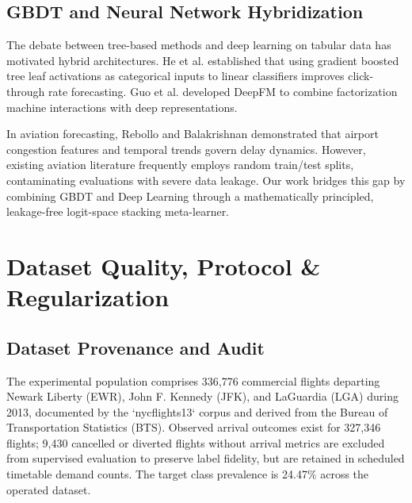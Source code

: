\documentclass[conference]{IEEEtran}
\begin{document}
\subsection{GBDT and Neural Network Hybridization}
The debate between tree-based methods and deep learning on tabular data has motivated hybrid architectures. He et al. \cite{he2014practical} established that using gradient boosted tree leaf activations as categorical inputs to linear classifiers improves click-through rate forecasting. Guo et al. \cite{guo2017deepfm} developed DeepFM to combine factorization machine interactions with deep representations. 

In aviation forecasting, Rebollo and Balakrishnan \cite{rebollo2014characterization} demonstrated that airport congestion features and temporal trends govern delay dynamics. However, existing aviation literature frequently employs random train/test splits, contaminating evaluations with severe data leakage. Our work bridges this gap by combining GBDT and Deep Learning through a mathematically principled, leakage-free logit-space stacking meta-learner.

\section{Dataset Quality, Protocol \& Regularization}
\subsection{Dataset Provenance and Audit}
The experimental population comprises 336,776 commercial flights departing Newark Liberty (EWR), John F. Kennedy (JFK), and LaGuardia (LGA) during 2013, documented by the `nycflights13` corpus \cite{wickham2014tidy} and derived from the Bureau of Transportation Statistics (BTS). Observed arrival outcomes exist for 327,346 flights; 9,430 cancelled or diverted flights without arrival metrics are excluded from supervised evaluation to preserve label fidelity, but are retained in scheduled timetable demand counts. The target class prevalence is 24.47\% across the operated dataset.
\end{document}
